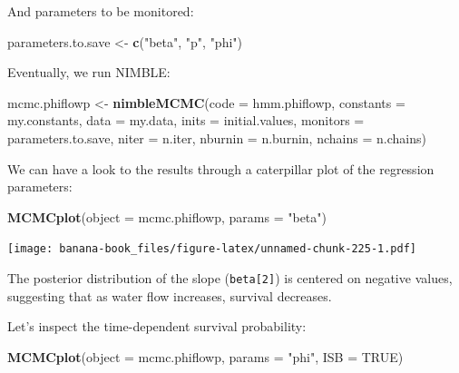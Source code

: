 \documentclass[
  12pt,
]{krantz}
\newenvironment{Shaded}{\begin{snugshade}}{\end{snugshade}}
\newcommand{\AttributeTok}[1]{\textcolor[rgb]{0.13,0.29,0.53}{#1}}
\newcommand{\ConstantTok}[1]{\textcolor[rgb]{0.56,0.35,0.01}{#1}}
\newcommand{\FunctionTok}[1]{\textcolor[rgb]{0.13,0.29,0.53}{\textbf{#1}}}
\newcommand{\NormalTok}[1]{#1}
\newcommand{\OtherTok}[1]{\textcolor[rgb]{0.56,0.35,0.01}{#1}}
\newcommand{\StringTok}[1]{\textcolor[rgb]{0.31,0.60,0.02}{#1}}
\begin{document}
And parameters to be monitored:

\begin{Shaded}
\begin{Highlighting}[]
\NormalTok{parameters.to.save }\OtherTok{\textless{}{-}} \FunctionTok{c}\NormalTok{(}\StringTok{"beta"}\NormalTok{, }\StringTok{"p"}\NormalTok{, }\StringTok{"phi"}\NormalTok{)}
\end{Highlighting}
\end{Shaded}

Eventually, we run NIMBLE:

\begin{Shaded}
\begin{Highlighting}[]
\NormalTok{mcmc.phiflowp }\OtherTok{\textless{}{-}} \FunctionTok{nimbleMCMC}\NormalTok{(}\AttributeTok{code =}\NormalTok{ hmm.phiflowp, }
                          \AttributeTok{constants =}\NormalTok{ my.constants,}
                          \AttributeTok{data =}\NormalTok{ my.data,              }
                          \AttributeTok{inits =}\NormalTok{ initial.values,}
                          \AttributeTok{monitors =}\NormalTok{ parameters.to.save,}
                          \AttributeTok{niter =}\NormalTok{ n.iter,}
                          \AttributeTok{nburnin =}\NormalTok{ n.burnin, }
                          \AttributeTok{nchains =}\NormalTok{ n.chains)}
\end{Highlighting}
\end{Shaded}

We can have a look to the results through a caterpillar plot of the regression parameters:

\begin{Shaded}
\begin{Highlighting}[]
\FunctionTok{MCMCplot}\NormalTok{(}\AttributeTok{object =}\NormalTok{ mcmc.phiflowp, }\AttributeTok{params =} \StringTok{"beta"}\NormalTok{)}
\end{Highlighting}
\end{Shaded}

\texttt{[image: banana-book\_files/figure-latex/unnamed-chunk-225-1.pdf]}

The posterior distribution of the slope (\texttt{beta{[}2{]}}) is centered on negative values, suggesting that as water flow increases, survival decreases.

Let's inspect the time-dependent survival probability:

\begin{Shaded}
\begin{Highlighting}[]
\FunctionTok{MCMCplot}\NormalTok{(}\AttributeTok{object =}\NormalTok{ mcmc.phiflowp, }\AttributeTok{params =} \StringTok{"phi"}\NormalTok{, }\AttributeTok{ISB =} \ConstantTok{TRUE}\NormalTok{)}
\end{Highlighting}
\end{Shaded}
\end{document}
